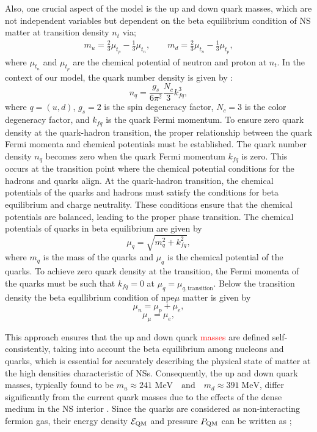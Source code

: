Also, one crucial aspect of the model is the up and down quark masses, which are not independent variables but dependent on the beta equilibrium condition of NS matter  at transition density $n_t$ via;
\begin{eqnarray}
	m_{u} = \frac{2}{3} \mu_{t_{p}} -  \frac{1}{3} \mu_{t_{n}}, \,\,\,\,\,\,\,\,\,\,\,\, m_{d} = \frac{2}{3} \mu_{t_{n}} -  \frac{1}{3} \mu_{t_{p}},
\end{eqnarray}
where $\mu_{t_{n}}$ and $\mu_{t_{p}}$ are the chemical potential of neutron and proton at $n_t$. In the context of our model, the quark number density is given by :
\[
n_q = \frac{g_s}{6\pi^2}\frac{N_c}{3} k_{fq}^3,
\]
where $q = (u,d)$,  \(g_s =2\) is the spin degeneracy factor, \(N_c =3\) is the color degeneracy factor, and \(k_{fq}\) is the quark Fermi momentum. To ensure zero quark density at the quark-hadron transition, the proper relationship between the quark Fermi momenta and chemical potentials must be established. The quark number density \(n_q\) becomes zero when the quark Fermi momentum \(k_{fq}\) is zero. This occurs at the transition point where the chemical potential conditions for the hadrons and quarks align. At the quark-hadron transition, the chemical potentials of the quarks and hadrons must satisfy the conditions for beta equilibrium and charge neutrality. These conditions ensure that the chemical potentials are balanced, leading to the proper phase transition. The chemical potentials of quarks in beta equilibrium are given by
\[
\mu_q = \sqrt{m_q^2 + k_{fq}^2}, 
\]
where $m_q$ is the mass of the quarks and $\mu_q$ is the chemical potential of the quarks. To achieve zero quark density at the transition, the Fermi momenta of the quarks must be such that \(k_{fq} = 0\) at \(\mu_q = \mu_{q, \text{transition}}\).
Below the transition density the beta equllibrium condition of npe$\mu$ matter is given by         \[
\mu_n = \mu_p + \mu_e,
\]
\[
\mu_\mu = \mu_e,
\]

{This approach ensures that the up and down quark \textcolor{red}{masses} are defined self-consistently, taking into account the beta equilibrium among nucleons and quarks, which is essential for accurately describing the physical state of matter at the high densities characteristic of NSs. Consequently, the up and down quark masses, typically found to be $m_u \approx 241 \text{ MeV} \quad \text{and} \quad m_d \approx 391\; \text{MeV}$, differ significantly from the current quark masses due to the effects of the dense medium in the NS interior \cite{PhysRevD.107.043025}. Since the quarks are considered as non-interacting fermion gas, their energy density ${\cal E}_{\rm QM}$ and pressure $P_{\rm QM}$ can be written as} \cite{PhysRevD.102.023021};


